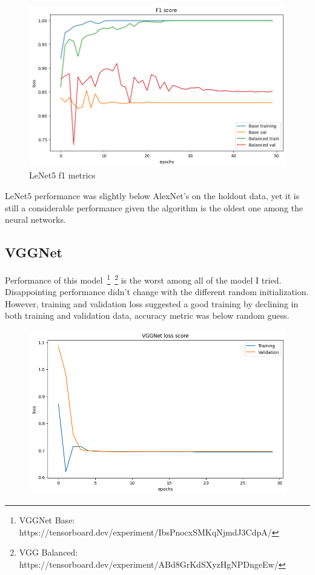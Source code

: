 \begin{figure}[H]
    \centering
    \includegraphics[width=.8\textwidth]{img/lenetf1.png}
    \caption{LeNet5 f1 metrics}
    \label{fig:lenetloss}
\end{figure}

LeNet5 performance was slightly below AlexNet's on the holdout data, yet it is still a considerable performance given the algorithm is the oldest one among the neural networks.

\subsection{VGGNet}
Performance of this model~\footnote{VGGNet Base: https://tensorboard.dev/experiment/IbsPnocxSMKqNjmdJ3CdpA/}~\footnote{VGG Balanced: https://tensorboard.dev/experiment/ABd8GrKdSXyzHgNPDngeEw/} is the worst among all of the model I tried.
Disappointing performance didn't change with the different random initialization.
However, training and validation loss suggested a good training by declining in both training and validation data, accuracy metric was below random guess.

\begin{figure}[H]
    \centering
    \includegraphics[width=.8\textwidth]{img/vggnetloss.png}
    \caption{}
    \label{fig:vggloss}
\end{figure}

